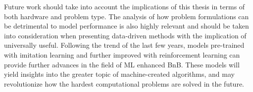 Future work should take into account the implications of this thesis in terms of both hardware and problem type. The analysis of how problem formulations can be detrimental to model performance is also highly relevant and should be taken into consideration when presenting data-driven methods with the implication of universally useful. Following the trend of the last few years, models pre-trained with imitation learning and further improved with reinforcement learning can provide further advances in the field of \gls{ML} enhanced \gls{BnB}. These models will yield insights into the greater topic of machine-created algorithms, and may revolutionize how the hardest computational problems are solved in the future.  


